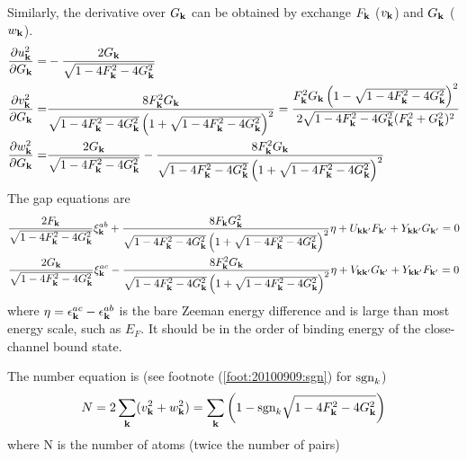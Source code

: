 Similarly, the derivative over $G_{\mathbf{k}}$ can be obtained by exchange $F_{\mathbf{k}}$ ($v_{\mathbf{k}}$) and $G_{\mathbf{k}}$ ($w_{\mathbf{k}}$).
\begin{equation}
\begin{split}
\frac{\partial{u_{\ensuremath{\mathbf{k}}}^2}}{\partial{G_{\ensuremath{\mathbf{k}}}}}=&-\frac{2 G_{\mathbf{k}}}{\sqrt{1-4 F_{\mathbf{k}}^2-4 G_{\mathbf{k}}^2}}\\
\frac{\partial{v_{\ensuremath{\mathbf{k}}}^2}}{\partial{G_{\ensuremath{\mathbf{k}}}}}=&\frac{8 F_{\mathbf{k}} ^{2}G_{\mathbf{k}}}{\sqrt{1-4 F_{\mathbf{k}}^2-4 G_{\mathbf{k}}^2} \left(1+\sqrt{1-4 F_{\mathbf{k}}^2-4 G_{\mathbf{k}}^2}\right)^2}
=\frac{F_{\mathbf{k}}^{2}G_{\mathbf{k}} \left(1-\sqrt{1-4 F_{\mathbf{k}}^2-4 G_{\mathbf{k}}^2}\right)^2}{2\sqrt{1-4 F_{\mathbf{k}}^2-4 G_{\mathbf{k}}^2} (F_{\mathbf{k}}^2 + G_{\mathbf{k}}^2)^2}\\
\frac{\partial{w_{\ensuremath{\mathbf{k}}}^2}}{\partial{G_{\ensuremath{\mathbf{k}}}}}=&\frac{2 G_{\mathbf{k}}}{\sqrt{1-4 F_{\mathbf{k}}^2-4 G_{\mathbf{k}}^2}}-\frac{8 F_{\mathbf{k}} ^{2}G_{\mathbf{k}}}{\sqrt{1-4 F_{\mathbf{k}}^2-4 G_{\mathbf{k}}^2} \left(1+\sqrt{1-4 F_{\mathbf{k}}^2-4 G_{\mathbf{k}}^2}\right)^2}
\end{split}
\end{equation}
The gap equations are 
\begin{subequations}\label{eq:20100909:fullgap}
\begin{gather}
\frac{2F_{\mathbf{k}}}{\sqrt{1-4 F_{\mathbf{k}}^2-4 G_{\mathbf{k}}^2}} \xi^{ab}_{\mathbf{k}}+\frac{8 F_{\mathbf{k}} G_{\mathbf{k}}^2}{\sqrt{1-4 F_{\mathbf{k}}^2-4 G_{\mathbf{k}}^2} \left(1+\sqrt{1-4 F_{\mathbf{k}}^2-4 G_{\mathbf{k}}^2}\right)^2}\eta+U_{\mathbf{k}\mathbf{k}'}F_{\mathbf{k}'}+Y_{\mathbf{k}\mathbf{k}'}G_{\mathbf{k}'}=0
\label{eq:20100909:fullgapa}\\
\frac{2G_{\mathbf{k}}}{\sqrt{1-4 F_{\mathbf{k}}^2-4 G_{\mathbf{k}}^2}} \xi^{ac}_{\mathbf{k}}-\frac{8 F_{\mathbf{k}}^{2} G_{\mathbf{k}}}{\sqrt{1-4 F_{\mathbf{k}}^2-4 G_{\mathbf{k}}^2} \left(1+\sqrt{1-4 F_{\mathbf{k}}^2-4 G_{\mathbf{k}}^2}\right)^2}\eta+V_{\mathbf{k}\mathbf{k}'}G_{\mathbf{k}'}+Y_{\mathbf{k}\mathbf{k}'}F_{\mathbf{k}'}=0
\label{eq:20100909:fullgapb}
\end{gather}
\end{subequations}
where $\eta=\epsilon^{ac}_{\mathbf{k}}-\epsilon^{ab}_{\mathbf{k}}$ is the bare Zeeman energy difference and is large than most energy scale, such as $E_{F}$.  It should be in the order of binding energy of the close-channel bound state.   

The number equation is (see footnote (\ref{foot:20100909:sgn}) for $\text{sgn}_{k}$)
\begin{equation}\label{eq:20100909:number}
N=2\sum_{\mathbf{k}}(v_{\mathbf{k}}^{2}+w_{\mathbf{k}}^{2})=\sum_{\mathbf{k}}\left(1-\text{sgn}_{k}\sqrt{1-4 F_{\mathbf{k}}^2-4 G_{\mathbf{k}}^2}\right)
\end{equation} 
where N is the number of atoms (twice  the number of pairs)
